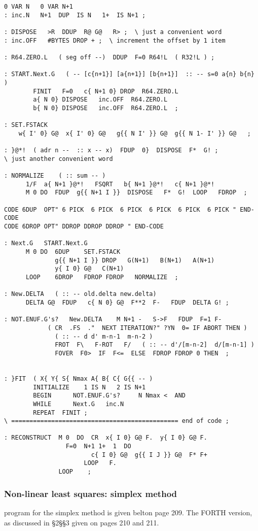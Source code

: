 \begin{lstlisting}
0 VAR N   0 VAR N+1
: inc.N   N+1  DUP  IS N   1+  IS N+1 ;

: DISPOSE   >R  DDUP  R@ G@   R> ;  \ just a convenient word
: inc.OFF   #BYTES DROP + ;  \ increment the offset by 1 item

: R64.ZERO.L   ( seg off --)  DDUP  F=0 R64!L  ( R32!L ) ;  

: START.Next.G   ( -- [c{n+1}] [a{n+1}] [b{n+1}]  :: -- s=0 a{n} b{n} )
        FINIT   F=0   c{ N+1 0} DROP  R64.ZERO.L
        a{ N 0} DISPOSE   inc.OFF  R64.ZERO.L
        b{ N 0} DISPOSE   inc.OFF  R64.ZERO.L  ;

: SET.FSTACK   
    w{ I' 0} G@  x{ I' 0} G@   g{{ N I' }} G@  g{{ N 1- I' }} G@   ;

: }@*!  ( adr n --  :: x -- x)  FDUP  0}  DISPOSE  F*  G! ;
\ just another convenient word

: NORMALIZE    ( :: sum -- )  
      1/F  a{ N+1 }@*!   FSQRT   b{ N+1 }@*!   c{ N+1 }@*!
      M 0 DO  FDUP  g{{ N+1 I }}  DISPOSE   F*  G!  LOOP   FDROP  ;

CODE 6DUP  OPT" 6 PICK  6 PICK  6 PICK  6 PICK  6 PICK  6 PICK " END-CODE
CODE 6DROP OPT" DDROP DDROP DDROP " END-CODE

: Next.G   START.Next.G 
      M 0 DO  6DUP    SET.FSTACK
              g{{ N+1 I }} DROP   G(N+1)   B(N+1)   A(N+1)
              y{ I 0} G@   C(N+1)
      LOOP    6DROP   FDROP FDROP   NORMALIZE  ;

: New.DELTA   ( :: -- old.delta new.delta)
      DELTA G@  FDUP   c{ N 0} G@  F**2  F-   FDUP  DELTA G! ;

: NOT.ENUF.G's?   New.DELTA    M N+1 -   S->F   FDUP  F=1 F- 
            ( CR  .FS  ."  NEXT ITERATION?" ?YN  0= IF ABORT THEN )
              ( :: -- d d' m-n-1  m-n-2 )  
              FROT  F\   F-ROT   F/   ( :: -- d'/[m-n-2]  d/[m-n-1] )
              FOVER  F0>  IF  F<=  ELSE  FDROP FDROP 0 THEN  ;


: }FIT  ( X{ Y{ S{ Nmax A{ B{ C{ G{{ -- )
        INITIALIZE    1 IS N   2 IS N+1
        BEGIN      NOT.ENUF.G's?     N Nmax <  AND 
        WHILE      Next.G   inc.N
        REPEAT  FINIT ;
\ ============================================== end of code ;

: RECONSTRUCT  M 0  DO  CR  x{ I 0} G@ F.  y{ I 0} G@ F. 
                 F=0  N+1 1+  1  DO 
                        c{ I 0} G@  g{{ I J }} G@  F* F+ 
                      LOOP   F. 
               LOOP    ;
\end{lstlisting}

\subsubsection{Non-linear least squares: simplex method}
 program for the simplex method is given belton page 209. The FORTH version, as discussed in \S2\S\S3 given on pages 210 and 211.

